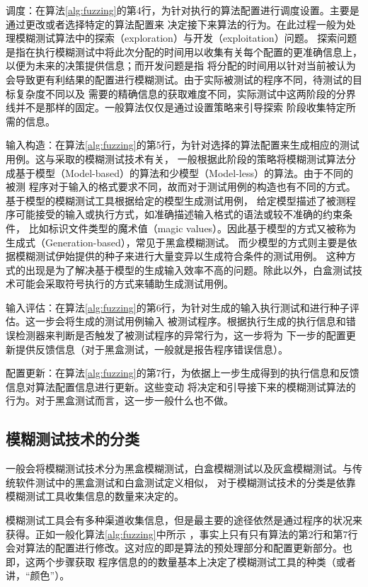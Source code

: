 \documentclass[bachelor]{njupthesis}
\begin{document}
调度：在算法\ref{alg:fuzzing}的第4行，为针对执行的算法配置进行调度设置。主要是通过更改或者选择特定的算法配置来
决定接下来算法的行为。在此过程一般为处理模糊测试算法中的探索（exploration）与开发（exploitation）问题。
探索问题是指在执行模糊测试中将此次分配的时间用以收集有关每个配置的更准确信息上，以便为未来的决策提供信息；而开发问题是指
将分配的时间用以针对当前被认为会导致更有利结果的配置进行模糊测试。由于实际被测试的程序不同，待测试的目标复杂度不同以及
需要的精确信息的获取难度不同，实际测试中这两阶段的分界线并不是那样的固定。一般算法仅仅是通过设置策略来引导探索
阶段收集特定所需的信息。

输入构造：在算法\ref{alg:fuzzing}的第5行，为针对选择的算法配置来生成相应的测试用例。这与采取的模糊测试技术有关，
一般根据此阶段的策略将模糊测试算法分成基于模型（Model-based）的算法和少模型（Model-less）的算法。由于不同的被测
程序对于输入的格式要求不同，故而对于测试用例的构造也有不同的方式。基于模型的模糊测试工具根据给定的模型生成测试用例，
给定模型描述了被测程序可能接受的输入或执行方式，如准确描述输入格式的语法或较不准确的约束条件，
比如标识文件类型的魔术值（magic values）。因此基于模型的方式又被称为生成式（Generation-based），常见于黑盒模糊测试。
而少模型的方式则主要是依据模糊测试伊始提供的种子来进行大量变异以生成符合条件的测试用例。
这种方式的出现是为了解决基于模型的生成输入效率不高的问题。除此以外，白盒测试技术可能会采取符号执行的方式来辅助生成测试用例。

输入评估：在算法\ref{alg:fuzzing}的第6行，为针对生成的输入执行测试和进行种子评估。这一步会将生成的测试用例输入
被测试程序。根据执行生成的执行信息和错误检测器来判断是否触发了被测试程序的异常行为，这一步将为
下一步的配置更新提供反馈信息（对于黑盒测试，一般就是报告程序错误信息）。

配置更新：在算法\ref{alg:fuzzing}的第7行，为依据上一步生成得到的执行信息和反馈信息对算法配置信息进行更新。这些变动
将决定和引导接下来的模糊测试算法的行为。对于黑盒测试而言，这一步一般什么也不做。

\subsection{模糊测试技术的分类}
一般会将模糊测试技术分为黑盒模糊测试，白盒模糊测试以及灰盒模糊测试。与传统软件测试中的黑盒测试和白盒测试\cite{myers2011art}定义相似，
对于模糊测试技术的分类是依靠模糊测试工具收集信息的数量来决定的\cite{manes2019art}。

模糊测试工具会有多种渠道收集信息，但是最主要的途径依然是通过程序的状况来获得。正如一般化算法\ref{alg:fuzzing}中所示
，事实上只有只有算法的第2行和第7行会对算法的配置进行修改。这对应的即是算法的预处理部分和配置更新部分。也即，这两个步骤获取
程序信息的的数量基本上决定了模糊测试工具的种类（或者讲，“颜色”）。
\end{document}
